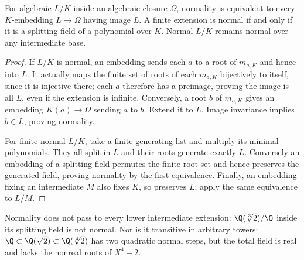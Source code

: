 \begin{theorem}
For algebraic $L/K$ inside an algebraic closure $\Omega$, normality is equivalent to every $K$-embedding $L\to\Omega$ having image $L$. A finite extension is normal if and only if it is a splitting field of a polynomial over $K$. Normal $L/K$ remains normal over any intermediate base.
\end{theorem}
\begin{proof}
If $L/K$ is normal, an embedding sends each $a$ to a root of $m_{a,K}$ and hence into $L$. It actually maps the finite set of roots of each $m_{a,K}$ bijectively to itself, since it is injective there; each $a$ therefore has a preimage, proving the image is all $L$, even if the extension is infinite. Conversely, a root $b$ of $m_{a,K}$ gives an embedding $K(a)\to\Omega$ sending $a$ to $b$. Extend it to $L$. Image invariance implies $b\in L$, proving normality.

For finite normal $L/K$, take a finite generating list and multiply its minimal polynomials. They all split in $L$ and their roots generate exactly $L$. Conversely an embedding of a splitting field permutes the finite root set and hence preserves the generated field, proving normality by the first equivalence. Finally, an embedding fixing an intermediate $M$ also fixes $K$, so preserves $L$; apply the same equivalence to $L/M$.
\end{proof}
\begin{example}
Normality does not pass to every lower intermediate extension: $\Q(\sqrt[3]{2})/\Q$ inside its splitting field is not normal. Nor is it transitive in arbitrary towers: $\Q\subset\Q(\sqrt2)\subset\Q(\sqrt[4]{2})$ has two quadratic normal steps, but the total field is real and lacks the nonreal roots of $X^4-2$.
\end{example}


